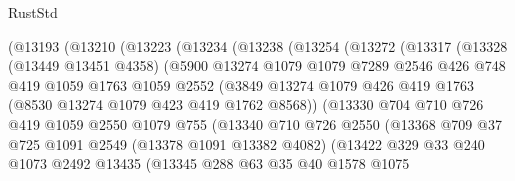 \begin{lexlean}{RustStd}
\begin{coremodule}
            (@13193
              (@13210
                (@13223
                  (@13234
                    (@13238
                      (@13254
                        (@13272
                          (@13317
                            (@13328
                              (@13449 @13451 @4358)
                              (@5900
                                @13274
                                @1079
                                @1079
                                @7289
                                @2546
                                @426
                                @748
                                @419
                                @1059
                                @1763
                                @1059
                                @2552
                                (@3849
                                  @13274
                                  @1079
                                  @426
                                  @419
                                  @1763
                                  (@8530 @13274 @1079 @423 @419 @1762 @8568))
                                (@13330
                                  @704
                                  @710
                                  @726
                                  @419
                                  @1059
                                  @2550
                                  @1079
                                  @755
                                  (@13340
                                    @710
                                    @726
                                    @2550
                                    (@13368
                                      @709
                                      @37
                                      @725
                                      @1091
                                      @2549
                                      (@13378 @1091 @13382 @4082)
                                      (@13422
                                        @329
                                        @33
                                        @240
                                        @1073
                                        @2492
                                        @13435
                                        (@13345
                                          @288
                                          @63
                                          @35
                                          @40
                                          @1578
                                          @1075

\end{coremodule}
\end{lexlean}
